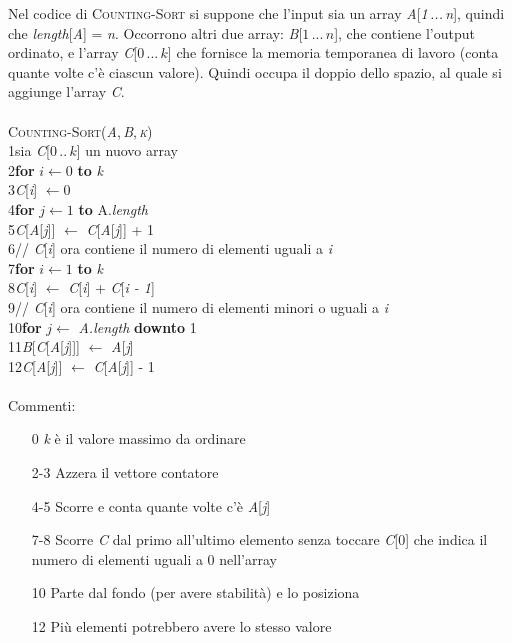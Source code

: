 \documentclass[10pt, a4paper]{report}
\newcommand\firsttab[1][0.5cm]{\hspace*{#1}}
\newcommand\secondtab[1][1cm]{\hspace*{#1}}
\begin{document}
Nel codice di \textsc{Counting-Sort} si suppone che l'input sia un array \textit{A}[\textit{1\,...\,n}], quindi che \textit{length}[\textit{A}] = \textit{n}. Occorrono altri due array: \textit{B}[$1\,...\,n$], che contiene l'output ordinato, e l'array \textit{C}[$0\,...\,k$] che fornisce la memoria temporanea di lavoro (conta quante volte c'è ciascun valore). Quindi occupa il doppio dello spazio, al quale si aggiunge l'array \textit{C}.\\\\
\textsc{Counting-Sort(\textit{A},\,\textit{B},\,\textit{k})}\\
1\firsttab sia \textit{C}[$0\,..\,k$] un nuovo array \\
2\firsttab\textbf{for} $i \leftarrow 0$ \textbf{to} \textit{k} \\
3\secondtab \textit{C}[\textit{i}] $\leftarrow 0$ \\
4\firsttab\textbf{for} $j \leftarrow 1$ \textbf{to} A.\textit{length} \\
5\secondtab \textit{C}[\textit{A}[\textit{j}]] $\leftarrow$ \textit{C}[\textit{A}[\textit{j}]] + 1 \\
6\firsttab // \textit{C}[\textit{i}] ora contiene il numero di elementi uguali a \textit{i} \\
7\firsttab\textbf{for} $i \leftarrow 1$ \textbf{to} \textit{k} \\
8\secondtab \textit{C}[\textit{i}] $\leftarrow$ \textit{C}[\textit{i}] + \textit{C}[\textit{i - 1}] \\
9\firsttab // \textit{C}[\textit{i}] ora contiene il numero di elementi minori o uguali a \textit{i} \\
10\firsttab\textbf{for} $j \leftarrow$ \textit{A.length} \textbf{downto} 1 \\
11\secondtab \textit{B}[\textit{C}[\textit{A}[\textit{j}]]] $\leftarrow$ \textit{A}[\textit{j}] \\
12\secondtab \textit{C}[\textit{A}[\textit{j}]] $\leftarrow$ \textit{C}[\textit{A}[\textit{j}]] - 1\\\\
Commenti:
\begin{enumerate}
\item[0]\textit{k} è il valore massimo da ordinare
\item[2-3]Azzera il vettore contatore
\item[4-5]Scorre e conta quante volte c'è \textit{A}[\textit{j}]
\item[7-8]Scorre \textit{C} dal primo all'ultimo elemento senza toccare \textit{C}[0] che indica il numero di elementi uguali a 0 nell'array
\item[10]Parte dal fondo (per avere stabilità) e lo posiziona
\item[12]Più elementi potrebbero avere lo stesso valore
\end{enumerate}
\end{document}
